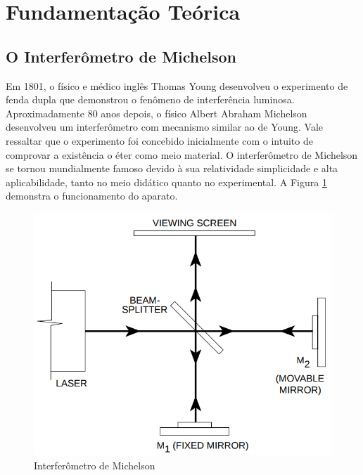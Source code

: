 
\section{Fundamentação Teórica}
\subsection{O Interferômetro de Michelson}

	Em 1801, o físico e médico inglês Thomas Young desenvolveu o experimento de fenda dupla que demonstrou o fenômeno de interferência luminosa. Aproximadamente 80 anos depois, o físico Albert Abraham Michelson desenvolveu um interferômetro com mecanismo similar ao de Young. Vale ressaltar que o experimento foi concebido inicialmente com o intuito de comprovar a existência o éter como meio material.
	O interferômetro de Michelson se tornou mundialmente famoso devido à sua relatividade simplicidade e alta aplicabilidade, tanto no meio didático quanto no experimental. A Figura \ref{im:int} demonstra o funcionamento do aparato.

 \begin{figure}[!htb]
 	\centering
 		\includegraphics[scale= 0.5]{interferometro.png}
 	\caption{Interferômetro de Michelson}
 	\label{im:int}
 \end{figure}


